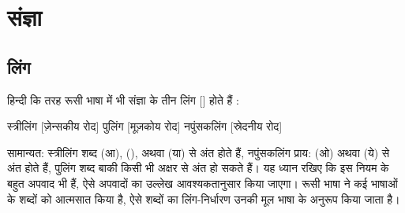 \chapter{संज्ञा}\label{ch: noun}


\section{लिंग}\label{sec:noun-gender}
हिन्दी कि तरह रूसी भाषा में भी संज्ञा के तीन लिंग []  होते हैं :

स्त्रीलिंग   [ज़ेन्सकीय रोद]
पुलिंग  [मूज़कोय रोद]
नपुंसकलिंग  [स्रेदनीय रोद]

सामान्यत: स्त्रीलिंग शब्द  (आ),  (),  अथवा  (या)  से अंत होते हैं, नपुंसकलिंग प्राय:  (ओ) अथवा
 (ये) से अंत होते हैं, पुलिंग शब्द बाकी किसी भी अक्षर से अंत हो सकते हैं। यह ध्यान रखिए कि इस नियम के बहुत अपवाद भी हैं, ऐसे अपवादों का उल्लेख
आवश्यकतानुसार किया जाएगा। रूसी भाषा ने कई भाषाओं के शब्दों को आत्मसात किया है, ऐसे शब्दों का लिंग-निर्धारण उनकी मूल भाषा के अनुरूप किया जाता है।

